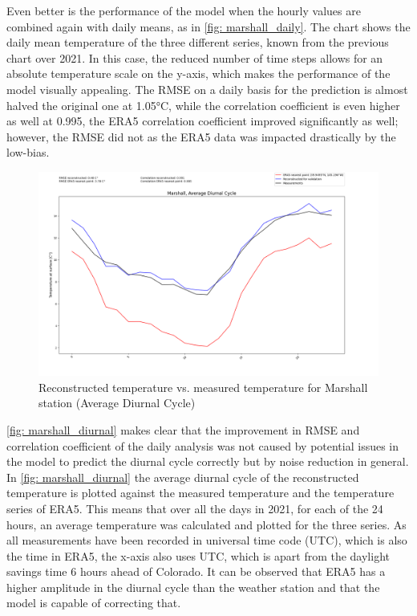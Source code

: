 Even better is the performance of the model when the hourly values are combined again with daily means, as in \autoref{fig: marshall_daily}.
The chart shows the daily mean temperature of the three different series, known from the previous chart over 2021.
In this case, the reduced number of time steps allows for an absolute temperature scale on the y-axis, which makes the performance of the model visually appealing.
The RMSE on a daily basis for the prediction is almost halved the original one at 1.05°C, while the correlation coefficient is even higher as well at 0.995, the ERA5 correlation coefficient improved significantly as well; however, the RMSE did not as the ERA5 data was impacted drastically by the low-bias.

\begin{figure}
    \centering
    \includegraphics[width=1.00\textwidth]{resources/images/charts/marshall_eval_grib_final/Marshall, Average Diurnal Cycle.png}
    \caption{Reconstructed temperature vs. measured temperature for Marshall station (Average Diurnal Cycle)}
    \label{fig: marshall_diurnal}
\end{figure}

\autoref{fig: marshall_diurnal} makes clear that the improvement in RMSE and correlation coefficient of the daily analysis was not caused by potential issues in the model to predict the diurnal cycle correctly but by noise reduction in general.
In \autoref{fig: marshall_diurnal} the average diurnal cycle of the reconstructed temperature is plotted against the measured temperature and the temperature series of ERA5.
This means that over all the days in 2021, for each of the 24 hours, an average temperature was calculated and plotted for the three series.
As all measurements have been recorded in universal time code (UTC), which is also the time in ERA5, the x-axis also uses UTC, which is apart from the daylight savings time 6 hours ahead of Colorado.
It can be observed that ERA5 has a higher amplitude in the diurnal cycle than the weather station and that the model is capable of correcting that.

